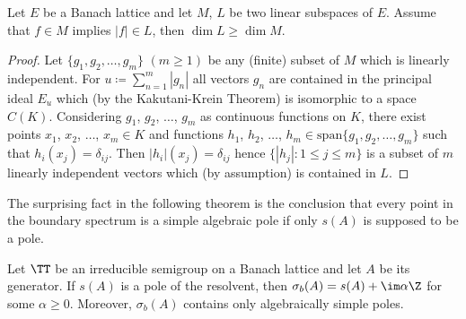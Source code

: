 \begin{lemma}\label{lem:c3-3.11}
	
	Let $E$ be a Banach lattice and let $M$, $L$ be two linear subspaces of\/ $E$.
	Assume that $f \in M$ implies $|f| \in L$, then $\dim L \geq \dim M$.
\end{lemma}
\begin{proof}
    Let $\{g_{1},g_{2},\ldots,g_{m}\}$ $(m\geq 1)$ be any (finite) subset of\/ $M$ which is linearly independent.
    For $u \coloneqq \sum_{n=1}^{m}|g_{n}|$ all vectors $g_{n}$ are contained in the principal ideal $E_{u}$ which (by the Kakutani-Krein Theorem) is isomorphic to a space $C(K)$.
    Considering $g_{1}$, $g_{2}$, $\ldots$, $g_{m}$ as continuous functions on $K$, there exist points $x_{1}$, $x_{2}$, $\ldots$, $x_{m} \in K$ and functions $h_{1}$, $h_{2}$, $\ldots$, $h_{m} \in \mathrm{span}\{g_{1},g_{2},\ldots,g_{m}\}$ such that $h_{i}(x_{j}) = \delta_{ij}$.
    Then $|h_{i}|(x_{j}) = \delta_{ij}$ hence $\{|h_{j}| \colon 1\leq j\leq m\}$
    is a subset of\/ $m$ linearly independent vectors which (by assumption) is contained in $L$.
\end{proof}

The surprising fact in the following theorem is the conclusion that every point in the boundary spectrum is a simple algebraic pole 
if only $s(A)$ is supposed to be a pole.

\begin{theorem}\label{thm:c3-3.12}

Let $\TT$ be an irreducible semigroup on a Banach lattice and let $A$ be its generator.
If\/ $s(A)$ is a pole of the resolvent, then $\sigma_{b}(A) = s(A) + \im\alpha\Z$ for some $\alpha \geq 0$.
Moreover, $\sigma_{b}(A)$ contains only algebraically simple poles.
\end{theorem}


